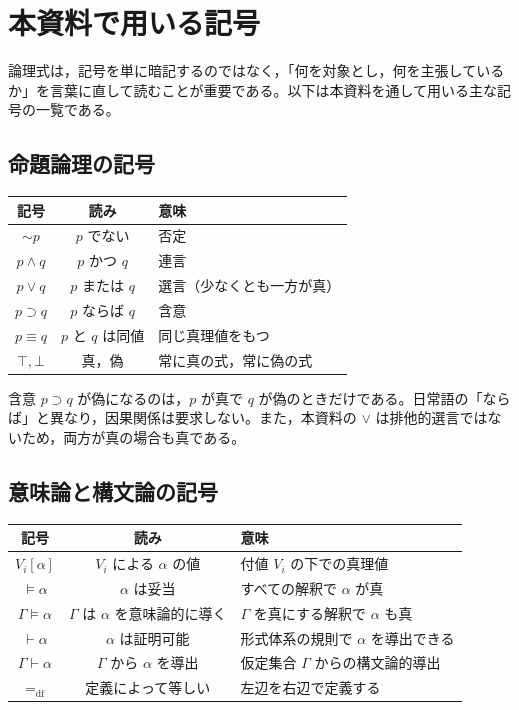 \documentclass[../main.tex]{subfiles}
\begin{document}
\section*{本資料で用いる記号}

論理式は，記号を単に暗記するのではなく，「何を対象とし，何を主張しているか」を言葉に直して読むことが重要である。以下は本資料を通して用いる主な記号の一覧である。

\subsection*{命題論理の記号}

\begin{center}
  \begin{tabular}{ccl}
    \hline
    記号 & 読み & 意味 \\
    \hline
    \(\sim p\) & \(p\) でない & 否定 \\
    \(p\land q\) & \(p\) かつ \(q\) & 連言 \\
    \(p\lor q\) & \(p\) または \(q\) & 選言（少なくとも一方が真） \\
    \(p\supset q\) & \(p\) ならば \(q\) & 含意 \\
    \(p\equiv q\) & \(p\) と \(q\) は同値 & 同じ真理値をもつ \\
    \(\top,\bot\) & 真，偽 & 常に真の式，常に偽の式 \\
    \hline
  \end{tabular}
\end{center}

含意 \(p\supset q\) が偽になるのは，\(p\) が真で \(q\) が偽のときだけである。日常語の「ならば」と異なり，因果関係は要求しない。また，本資料の \(\lor\) は排他的選言ではないため，両方が真の場合も真である。

\subsection*{意味論と構文論の記号}

\begin{center}
  \begin{tabular}{ccl}
    \hline
    記号 & 読み & 意味 \\
    \hline
    \(V_i[\alpha]\) & \(V_i\) による \(\alpha\) の値 & 付値 \(V_i\) の下での真理値 \\
    \(\vDash\alpha\) & \(\alpha\) は妥当 & すべての解釈で \(\alpha\) が真 \\
    \(\Gamma\vDash\alpha\) & \(\Gamma\) は \(\alpha\) を意味論的に導く & \(\Gamma\) を真にする解釈で \(\alpha\) も真 \\
    \(\vdash\alpha\) & \(\alpha\) は証明可能 & 形式体系の規則で \(\alpha\) を導出できる \\
    \(\Gamma\vdash\alpha\) & \(\Gamma\) から \(\alpha\) を導出 & 仮定集合 \(\Gamma\) からの構文論的導出 \\
    \(=_{\mathrm{df}}\) & 定義によって等しい & 左辺を右辺で定義する \\
    \hline
  \end{tabular}
\end{center}
\end{document}
